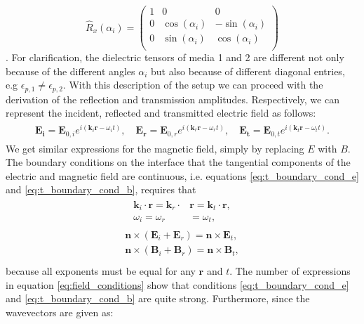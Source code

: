 \begin{equation}
    \label{eq:x_rotation_matrix}
    \hat{R}_x(\alpha_i) = 
    \begin{pmatrix}
        1 & 0 & 0 \\
        0 & \cos (\alpha_i) & -\sin (\alpha_i) \\
        0 & \sin (\alpha_i) & \cos (\alpha_i) \\
    \end{pmatrix}
\end{equation}
\cite{J.Muthsam2006}.
For clarification, the dielectric tensors of media 1 and 2 are different not only because of the different angles $\alpha_i$ but also because of different diagonal entries, e.g $\epsilon_{p,1} \neq \epsilon_{p,2}$. With this description of the setup we can proceed with the derivation of the reflection and transmission amplitudes. Respectively, we can represent the incident, reflected and transmitted electric field as follows:
\begin{align}
\begin{split}
    \bm{E_i} = \bm{E}_{0,i}e^{i(\bm{k}_i\bm{r}-\omega_i t)},
    \quad
    \bm{E_r} = \bm{E}_{0,r}e^{i(\bm{k}_r\bm{r}-\omega_r t)},
    \quad
    \bm{E_t} = \bm{E}_{0,t}e^{i(\bm{k}_t\bm{r}-\omega_t t)}.
\end{split}
\end{align}
We get similar expressions for the magnetic field, simply by replacing $E$ with $B$. 
The boundary conditions on the interface that the tangential components of the electric and magnetic field are continuous, i.e. equations \ref{eq:t_boundary_cond_e} and \ref{eq:t_boundary_cond_b}, requires that
\begin{align}
\begin{split}
    \label{eq:field_conditions}
    \bm{k}_i \cdot \bm{r} = \bm{k}_r \cdot& \bm{r} = \bm{k}_t \cdot \bm{r}, \\
    \omega_i = \omega_r& = \omega_t,
\end{split}
\end{align}
\begin{align}
\begin{split}
    \label{eq:interface_amplitudes}
    \bm{n} \times (\bm{E}_{i} + \bm{E}_{r}) = \bm{n} \times \bm{E}_{t}, \\
    \bm{n} \times (\bm{B}_{i} + \bm{B}_{r}) = \bm{n} \times \bm{B}_{t}, \\
\end{split}
\end{align}
because all exponents must be equal for any $\bm{r}$ and $t$. The number of expressions in equation \ref{eq:field_conditions} show that conditions \ref{eq:t_boundary_cond_e} and \ref{eq:t_boundary_cond_b} are quite strong. Furthermore, since the wavevectors are given as:
